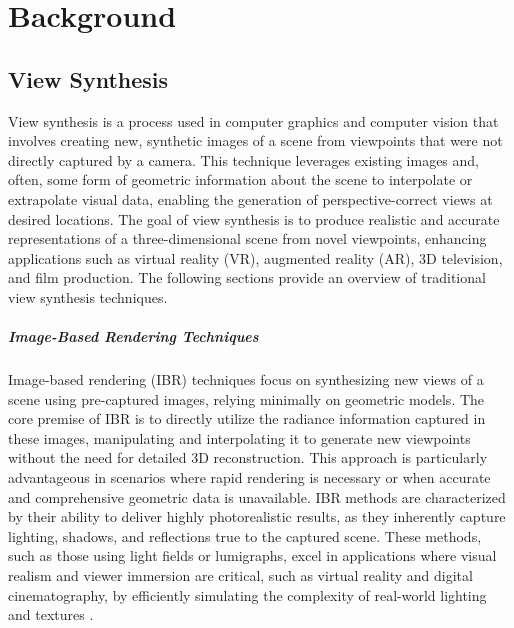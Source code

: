 %
\chapter{Background}
\label{sec:background}

\section{View Synthesis}

View synthesis is a process used in computer graphics and computer vision that involves creating new, synthetic images of a scene from viewpoints that were not directly captured by a camera.
This technique leverages existing images and, often, some form of geometric information about the scene to interpolate or extrapolate visual data, enabling the generation of perspective-correct views at desired locations.
The goal of view synthesis is to produce realistic and accurate representations of a three-dimensional scene from novel viewpoints, enhancing applications such as virtual reality (VR), augmented reality (AR), 3D television, and film production.
The following sections provide an overview of traditional view synthesis techniques.

\paragraph{Image-Based Rendering Techniques}
Image-based rendering (IBR) techniques focus on synthesizing new views of a scene using pre-captured images, relying minimally on geometric models.
The core premise of IBR is to directly utilize the radiance information captured in these images, manipulating and interpolating it to generate new viewpoints without the need for detailed 3D reconstruction.
This approach is particularly advantageous in scenarios where rapid rendering is necessary or when accurate and comprehensive geometric data is unavailable.
IBR methods are characterized by their ability to deliver highly photorealistic results, as they inherently capture lighting, shadows, and reflections true to the captured scene.
These methods, such as those using light fields or lumigraphs, excel in applications where visual realism and viewer immersion are critical, such as virtual reality and digital cinematography, by efficiently simulating the complexity of real-world lighting and textures \cite{buehler_unstructured_2001,chen_view_1993,debevec_modeling_1996,gortler_lumigraph_1996,levoy_light_1996}.

